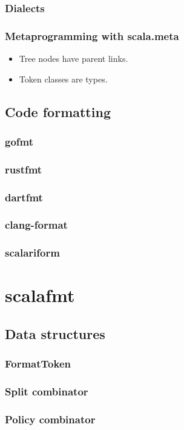 \documentclass[11pt,a4paper]{article}
\begin{document}
\subsubsection{Dialects}
\subsubsection{Metaprogramming with scala.meta}
\begin{itemize}
  \item Tree nodes have parent links.
  \item Token classes are types.
\end{itemize}
\subsection{Code formatting}
\subsubsection{gofmt}
\subsubsection{rustfmt}
\subsubsection{dartfmt}
\subsubsection{clang-format}
\subsubsection{scalariform}
\section{scalafmt}
\subsection{Data structures}
\subsubsection{FormatToken}
\subsubsection{Split combinator}
\subsubsection{Policy combinator}
\end{document}
